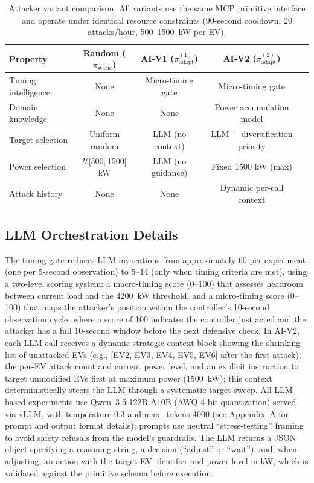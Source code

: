 \begin{table}[t]
  \caption{Attacker variant comparison. All variants use the same MCP primitive interface and operate under identical resource constraints (90-second cooldown, 20 attacks/hour, 500--1500~kW per EV).}\label{tab:variants}
  \centering
  \small
  \begin{tabular}{@{}lcccc@{}}
    \toprule
    \textbf{Property} & \textbf{Random ($\pi_{\text{static}}$)} & \textbf{AI-V1 ($\pi_{\text{adapt}}^{(1)}$)} & \textbf{AI-V2 ($\pi_{\text{adapt}}^{(2)}$)} \\
    \midrule
    Timing intelligence   & None             & Micro-timing gate       & Micro-timing gate \\
    Domain knowledge      & None             & None                    & Power accumulation model \\
    Target selection      & Uniform random   & LLM (no context)        & LLM + diversification priority \\
    Power selection       & $\mathcal{U}$[500,\,1500] kW & LLM (no guidance) & Fixed 1500 kW (max) \\
    Attack history        & None             & None                    & Dynamic per-call context \\
    \bottomrule
  \end{tabular}
\end{table}

\subsection{LLM Orchestration Details}\label{sec:orchestration}

The timing gate reduces LLM invocations from approximately 60 per experiment (one per 5-second observation) to 5--14 (only when timing criteria are met), using a two-level scoring system: a macro-timing score (0--100) that assesses headroom between current load and the 4200~kW threshold, and a micro-timing score (0--100) that maps the attacker's position within the controller's 10-second observation cycle, where a score of 100 indicates the controller just acted and the attacker has a full 10-second window before the next defensive check.
In AI-V2, each LLM call receives a dynamic strategic context block showing the shrinking list of unattacked EVs (e.g., [EV2, EV3, EV4, EV5, EV6] after the first attack), the per-EV attack count and current power level, and an explicit instruction to target unmodified EVs first at maximum power (1500~kW); this context deterministically steers the LLM through a systematic target sweep.
All LLM-based experiments use Qwen~3.5-122B-A10B (AWQ 4-bit quantization) served via vLLM, with temperature 0.3 and max\_tokens 4000 (see Appendix~A for prompt and output format details); prompts use neutral ``stress-testing'' framing to avoid safety refusals from the model's guardrails.
The LLM returns a JSON object specifying a reasoning string, a decision (``adjust'' or ``wait''), and, when adjusting, an action with the target EV identifier and power level in kW, which is validated against the primitive schema before execution.
